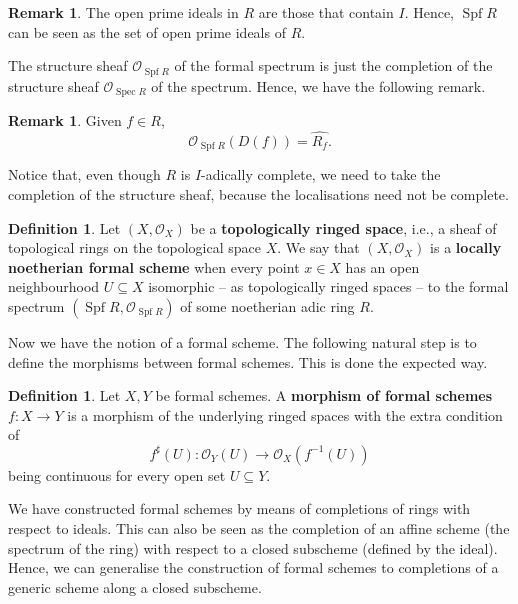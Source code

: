 \documentclass{report}
\DeclareMathOperator{\Spf}{Spf}
\DeclareMathOperator{\Spec}{Spec}
\theoremstyle{definition}
\newtheorem{definition}[theorem]{Definition}
\newtheorem{remark}[theorem]{Remark}
\begin{document}
\begin{remark}
The open prime ideals in $R$ are those that contain $I$. Hence, $\Spf R$ can be seen as the set of open prime ideals of $R$.
\end{remark}

The structure sheaf $\mathcal{O}_{\Spf R}$ of the formal spectrum is just the completion of the structure sheaf $\mathcal{O}_{\Spec R}$ of the spectrum. Hence, we have the following remark.

\begin{remark}
Given $f\in R$,
\[\mathcal{O}_{\Spf R}(D(f))=\widehat{R_f}.\]
\end{remark}

Notice that, even though $R$ is $I$-adically complete, we need to take the completion of the structure sheaf, because the localisations need not be complete.

\begin{definition}
Let $(X,\mathcal{O}_X)$ be a \textbf{topologically ringed space}, i.e., a sheaf of topological rings on the topological space $X$. We say that $(X,\mathcal{O}_X)$ is a \textbf{locally noetherian formal scheme} when every point $x\in X$ has an open neighbourhood $U\subseteq X$ isomorphic -- as topologically ringed spaces -- to the formal spectrum $(\Spf R,\mathcal{O}_{\Spf R})$ of some noetherian adic ring $R$.
\end{definition}

Now we have the notion of a formal scheme. The following natural step is to define the morphisms between formal schemes. This is done the expected way.

\begin{definition}
Let $X,Y$ be formal schemes. A \textbf{morphism of formal schemes} $f:X\rightarrow Y$ is a morphism of the underlying ringed spaces with the extra condition of
\[f^{\sharp}(U):\mathcal{O}_Y(U)\longrightarrow\mathcal{O}_X(f^{-1}(U))\]
being continuous for every open set $U\subseteq Y$.
\end{definition}

We have constructed formal schemes by means of completions of rings with respect to ideals. This can also be seen as the completion of an affine scheme (the spectrum of the ring) with respect to a closed subscheme (defined by the ideal). Hence, we can generalise the construction of formal schemes to completions of a generic scheme along a closed subscheme.
\end{document}
